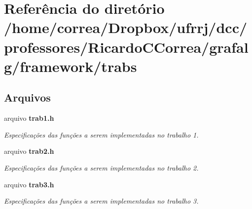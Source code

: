 \section{Referência do diretório /home/correa/\+Dropbox/ufrrj/dcc/professores/\+Ricardo\+C\+Correa/grafalg/framework/trabs}
\label{dir_fbc855aee6d9d4fcc04b0cb2ef6096df}
\subsection*{Arquivos}
\begin{DoxyCompactItemize}
\item 
arquivo {\bf trab1.\+h}
\begin{DoxyCompactList}\small\item\em Especificações das funções a serem implementadas no trabalho 1. \end{DoxyCompactList}\item 
arquivo {\bf trab2.\+h}
\begin{DoxyCompactList}\small\item\em Especificações das funções a serem implementadas no trabalho 2. \end{DoxyCompactList}\item 
arquivo {\bf trab3.\+h}
\begin{DoxyCompactList}\small\item\em Especificações das funções a serem implementadas no trabalho 3. \end{DoxyCompactList}\end{DoxyCompactItemize}
